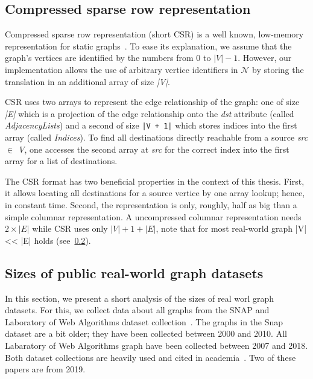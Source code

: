 \subsection{Compressed sparse row representation}\label{subsec:csr-background}
Compressed sparse row representation (short CSR) is a well known, low-memory representation for static graphs~\cite{csr,csr-first}.
To ease its explanation, we assume that the graph's vertices are identified by the numbers from 0 to $|V| - 1$.
However, our implementation allows the use of arbitrary vertice identifiers in $\mathcal{N}$ by storing the translation in an additional
array of size \textit{|V|}.

CSR uses two arrays to represent the edge relationship of the graph: one of size \textit{|E|} which is a projection of the edge relationship
onto the \textit{dst} attribute (called \textit{AdjacencyLists}) and a second of size \texttt{|V + 1|} which stores indices into the first
array (called \textit{Indices}).
To find all destinations directly reachable from a source \textit{src $\in$ V}, one accesses the second array at \textit{src} for the
correct index into the first array for a list of destinations.

The CSR format has two beneficial properties in the context of this thesis.
First, it allows locating all destinations for a source vertice by one array lookup;
hence, in constant time.
Second, the representation is only, roughly, half as big than a simple columnar representation.
A uncompressed columnar representation needs $2 \times |E|$ while CSR uses only $|V| + 1 + |E|$, note that for most real-world graph |V|
<< |E| holds (see~\cref{subsec:graph-analysis}).

\subsection{Sizes of public real-world graph datasets} \label{subsec:graph-analysis}
In this section, we present a short analysis of the sizes of real worl graph datasets.
For this, we collect data about all graphs from the SNAP and Laboratory of Web Algorithms dataset collection~\cite{snap-datasets,
labaratory-of-web-algorithms-datasets}.
The graphs in the Snap dataset are a bit older;
they have been collected between 2000 and 2010.
All Labaratory of Web Algorithms graph have been collected between 2007 and 2018.
Both dataset collections are heavily used and cited in academia~\cite{ammar2018distributed,olddog,myria-detailed,fractal,longbin}.
Two of these papers are from 2019.

